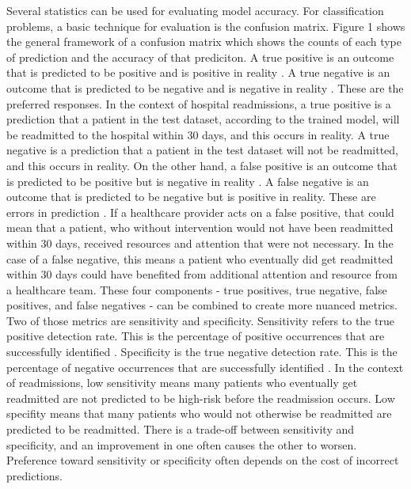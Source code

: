 \documentclass[sigconf]{acmart}
\begin{document}
Several statistics can be used for evaluating model accuracy. For classification problems, a basic technique for evaluation is the confusion matrix. Figure 1 shows the general framework of a confusion matrix which shows the counts of each type of prediction and the accuracy of that prediciton. A true positive is an outcome that is predicted to be positive and is positive in reality \cite{cite12}. A true negative is an outcome that is predicted to be negative and is negative in reality \cite{cite12}. These are the preferred responses. In the context of hospital readmissions, a true positive is a prediction that a patient in the test dataset, according to the trained model, will be readmitted to the hospital within 30 days, and this occurs in reality. A true negative is a prediction that a patient in the test dataset will not be readmitted, and this occurs in reality.
On the other hand, a false positive is an outcome that is predicted to be positive but is negative in reality \cite{cite12}. A false negative is an outcome that is predicted to be negative but is positive in reality. These are errors in prediction \cite{cite12}. If a healthcare provider acts on a false positive, that could mean that a patient, who without intervention would not have been readmitted within 30 days, received resources and attention that were not necessary. In the case of a false negative, this means a patient who eventually did get readmitted within 30 days could have benefited from additional attention and resource from a healthcare team. 
These four components - true positives, true negative, false positives, and false negatives - can be combined to create more nuanced metrics. Two of those metrics are sensitivity and specificity. Sensitivity refers to the true positive detection rate. This is the percentage of positive occurrences that are successfully identified \cite{cite12}. Specificity is the true negative detection rate. This is the percentage of negative occurrences that are successfully identified \cite{cite12}.
In the context of readmissions, low sensitivity means many patients who eventually get readmitted are not predicted to be high-risk before the readmission occurs. Low specifity means that many patients who would not otherwise be readmitted are predicted to be readmitted. There is a trade-off between sensitivity and specificity, and an improvement in one often causes the other to worsen. Preference toward sensitivity or specificity often depends on the cost of incorrect predictions.
\end{document}
